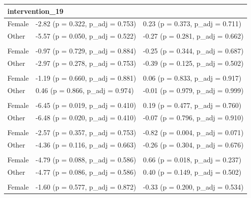 \documentclass[
  letterpaper,
  DIV=11,
  numbers=noendperiod]{scrartcl}
\begin{document}
\begin{longtable}{l|ll}
\multicolumn{3}{l}{{\bfseries intervention\_19}} \\[2.5pt] 
\midrule\addlinespace[2.5pt]
Female & {-2.82 (p = 0.322, p\_adj = 0.753)} & {0.23 (p = 0.373, p\_adj = 0.711)} \\ 
Other & {-5.57 (p = 0.050, p\_adj = 0.522)} & {-0.27 (p = 0.281, p\_adj = 0.662)} \\ 
\midrule\addlinespace[2.5pt]
\multicolumn{3}{l}{{\bfseries intervention\_2}} \\[2.5pt] 
\midrule\addlinespace[2.5pt]
Female & {-0.97 (p = 0.729, p\_adj = 0.884)} & {-0.25 (p = 0.344, p\_adj = 0.687)} \\ 
Other & {-2.97 (p = 0.278, p\_adj = 0.753)} & {-0.39 (p = 0.125, p\_adj = 0.502)} \\ 
\midrule\addlinespace[2.5pt]
\multicolumn{3}{l}{{\bfseries intervention\_20}} \\[2.5pt] 
\midrule\addlinespace[2.5pt]
Female & {-1.19 (p = 0.660, p\_adj = 0.881)} & {0.06 (p = 0.833, p\_adj = 0.917)} \\ 
Other & {0.46 (p = 0.866, p\_adj = 0.974)} & {-0.01 (p = 0.979, p\_adj = 0.999)} \\ 
\midrule\addlinespace[2.5pt]
\multicolumn{3}{l}{{\bfseries intervention\_3}} \\[2.5pt] 
\midrule\addlinespace[2.5pt]
Female & {-6.45 (p = 0.019, p\_adj = 0.410)} & {0.19 (p = 0.477, p\_adj = 0.760)} \\ 
Other & {-6.48 (p = 0.020, p\_adj = 0.410)} & {-0.07 (p = 0.796, p\_adj = 0.910)} \\ 
\midrule\addlinespace[2.5pt]
\multicolumn{3}{l}{{\bfseries intervention\_4}} \\[2.5pt] 
\midrule\addlinespace[2.5pt]
Female & {-2.57 (p = 0.357, p\_adj = 0.753)} & {-0.82 (p = 0.004, p\_adj = 0.071)} \\ 
Other & {-4.36 (p = 0.116, p\_adj = 0.663)} & {-0.26 (p = 0.304, p\_adj = 0.676)} \\ 
\midrule\addlinespace[2.5pt]
\multicolumn{3}{l}{{\bfseries intervention\_5}} \\[2.5pt] 
\midrule\addlinespace[2.5pt]
Female & {-4.79 (p = 0.088, p\_adj = 0.586)} & {0.66 (p = 0.018, p\_adj = 0.237)} \\ 
Other & {-4.77 (p = 0.086, p\_adj = 0.586)} & {0.40 (p = 0.149, p\_adj = 0.502)} \\ 
\midrule\addlinespace[2.5pt]
\multicolumn{3}{l}{{\bfseries intervention\_6}} \\[2.5pt] 
\midrule\addlinespace[2.5pt]
Female & {-1.60 (p = 0.577, p\_adj = 0.872)} & {-0.33 (p = 0.200, p\_adj = 0.534)} \\ 

\end{longtable}
\end{document}
